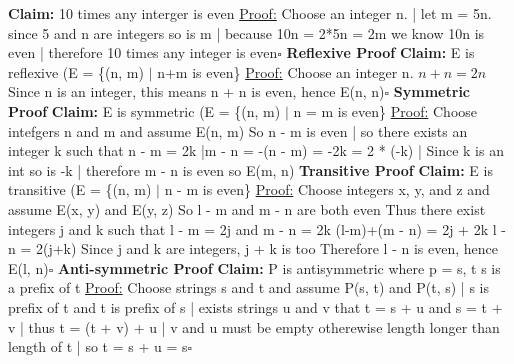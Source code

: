 \documentclass{article}
\begin{document}
\textbf{Claim: }10 times any interger is even\newline
\underline{Proof:} Choose an integer n. | let m = 5n. since 5 and n are integers so is m | because 10n = 2*5n = 2m we know 10n is even | therefore 10 times any integer is even$\square$\newline\newline
\textbf{Reflexive Proof}\newline
\textbf{Claim: }E is reflexive (E = \{(n, m) $\mid$ n+m is even\}\newline
\underline{Proof:} Choose an integer n.\newline
${n+n = 2n}$\newline
Since n is an integer, this means n + n is even, hence E(n, n)$\square$\newline\newline
\textbf{Symmetric Proof}\newline
\textbf{Claim: } E is symmetric (E = \{(n, m) $\mid$ n = m is even\}
\underline{Proof:} Choose intefgers n and m and assume E(n, m)\newline
So n - m is even | so there exists an integer k such that n - m = 2k |m - n = -(n - m) = -2k = 2 * (-k) | Since k is an int so is -k | therefore m - n is even so E(m, n)\newline\newline
\textbf{Transitive Proof}\newline
\textbf{Claim: }E is transitive (E = \{(n, m) $\mid$ n - m is even\}\newline
\underline{Proof:} Choose integers x, y, and z and assume E(x, y) and E(y, z)\newline
So l - m and m - n are both even\newline
Thus there exist integers j and k such that l - m = 2j and m - n = 2k\newline
(l-m)+(m - n) = 2j + 2k\newline
l - n = 2(j+k)\newline
Since j and k are integers, j + k is too\newline
Therefore l - n is even, hence E(l, n)$\square$\newline\newline
\textbf{Anti-symmetric Proof}\newline
\textbf{Claim: } P is antisymmetric where p = s, t s is a prefix of t\newline
\underline{Proof:} Choose strings s and t and assume P(s, t) and P(t, s) | s is prefix of t and t is prefix of s | exists strings u and v that t = s + u and s = t + v | thus t = (t + v) + u | v and u must be empty otherewise length longer than length of t | so t = s + u = s$\square$

\enddocument
\end{document}
